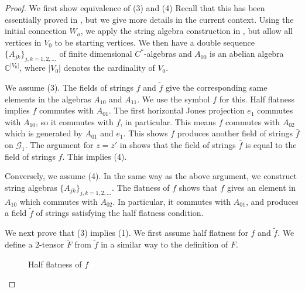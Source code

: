 \documentclass[10pt,a4paper]{amsart}
\begin{document}
\begin{proof}

We first show equivalence of (3) and (4)
Recall that this has been essentially
proved in \cite[pages 563--564]{EK1}, but we give more
details in the current context.
Using the initial connection $W_a$, we apply the
string algebra construction in \cite[Section 11.3]{EK1},
but allow all vertices in $V_0$ to be starting vertices.
We then have a double sequence $\{A_{jk}\}_{j,k=1,2,\dots}$
of finite dimensional $C^*$-algebras and $A_{00}$
is an abelian algebra $\mathbb{C}^{|V_0|}$, where
$|V_0|$ denotes the cardinality of $V_0$.  

We assume (3).  The fields of strings $f$ and $\tilde f$
give the corresponding same elements in the algebras $A_{10}$
and $A_{11}$.  We use the symbol $f$ for this.  
Half flatness implies $f$ commutes with $A_{01}$.
The first horizontal Jones projection $e_1$ commutes with
$A_{10}$, so it commutes with $f$, in particular.  This
means $f$ commutes with $A_{02}$ which is generated by
$A_{01}$ and $e_1$.  This shows $f$ produces another
field of strings $\bar f$ on $\mathcal{G}_1$.  The
argument for $z=z'$ in \cite[Fig.~11.16]{EK1} shows
that the field of strings $\bar f$ is equal to the
field of strings $f$.  This implies (4).

Conversely, we assume (4).  In the same way as the
above argument, we construct string algebras 
$\{A_{jk}\}_{j,k=1,2,\dots}$.  The flatness of
$f$ shows that $f$ gives an element in $A_{10}$ which
commutes with $A_{02}$.  In particular, it commutes with
$A_{01}$, and produces a field $\tilde f$ of strings
satisfying the half flatness condition.

We next prove that (3) implies (1).
We first assume half flatness for $f$ and $\tilde f$.
We define a $2$-tensor $\tilde F$ from $\tilde f$ in
a similar way to the definition of $F$.

\begin{figure}[H]
\begin{center}
\caption{Half flatness of $f$}
\label{halfflatf}
\end{center}
\end{figure}


\end{proof}
\end{document}
